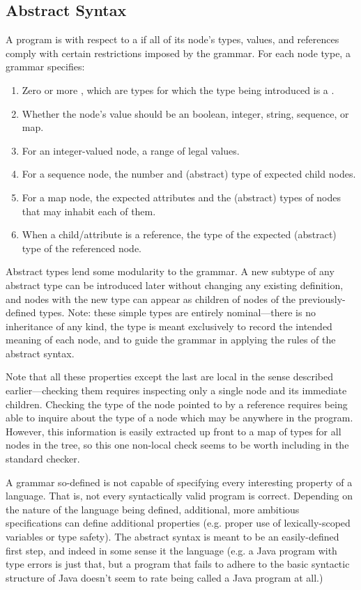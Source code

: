 \subsection{Abstract Syntax}
A program is  with respect to a  if all of its node's types, values, and references comply with certain restrictions imposed by the grammar. For each node type, a grammar specifies:
\begin{enumerate}
\item Zero or more , which are types for which the type being introduced is a .
\item Whether the node's value should be an boolean, integer, string, sequence, or map.
\item For an integer-valued node, a range of legal values.
\item For a sequence node, the number and (abstract) type of expected child nodes.
\item For a map node, the expected attributes and the (abstract) types of nodes that may inhabit each of them.
\item When a child/attribute is a reference, the type of the expected (abstract) type of the referenced node.
\end{enumerate}

Abstract types lend some modularity to the grammar. A new subtype of any abstract type can be introduced later without changing any existing definition, and nodes with the new type can appear as children of nodes of the previously-defined types. Note: these simple types are entirely nominal---there is no inheritance of any kind, the type is meant exclusively to record the intended meaning of each node, and to guide the grammar in applying the rules of the abstract syntax.

Note that all these properties except the last are local in the sense described earlier---checking them requires inspecting only a single node and its immediate children. Checking the type of the node pointed to by a reference requires being able to inquire about the type of a node which may be anywhere in the program. However, this information is easily extracted up front to a map of types for all nodes in the tree, so this one non-local check seems to be worth including in the standard checker.

A grammar so-defined is not capable of specifying every interesting property of a language. That is, not every syntactically valid program is correct. Depending on the nature of the language being defined, additional, more ambitious specifications can define additional properties (e.g. proper use of lexically-scoped variables or type safety). The abstract syntax is meant to be an easily-defined first step, and indeed in some sense it  the language (e.g. a Java program with type errors is just that, but a program that fails to adhere to the basic syntactic structure of Java doesn't seem to rate being called a Java program at all.)


